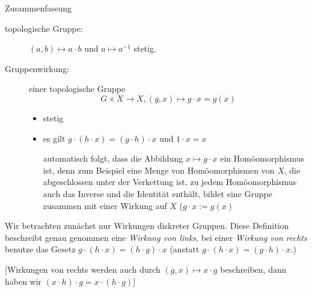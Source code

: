 \documentclass[a4paper,10pt]{scrartcl}
\begin{document}
\begin{seg}{Zusammenfassung}
 \begin{description}
  \item[topologische Gruppe:] $(a,b)\mapsto a\cdot b$ und $a\mapsto a^{-1}$ stetig.
  \item[Gruppenwirkung:] einer topologische Gruppe
\[
 G\times X\to X, (g,x) \mapsto g\cdot x=g(x) 
\]
\begin{itemize}
 \item stetig
 \item es gilt $g\cdot (h\cdot x)=(g\cdot h)\cdot x$ und $1\cdot x = x$

automatisch folgt, dass die Abbildung $x\mapsto g\cdot x$ ein Homöomorphismus ist, denn zum Beispiel eine Menge von Homöomorphismen von $X$, die abgeschlossen unter der Verkettung ist, zu jedem Homöomorphismus auch das Inverse und die Identität enthält, bildet eine Gruppe zusammen mit einer Wirkung auf $X$ ($g\cdot x:=g(x)$
\end{itemize}
 \end{description}
\end{seg}
Wir betrachten zunächst nur Wirkungen diskreter Gruppen. Diese Definition beschreibt genau genommen eine \emph{Wirkung von links}, bei einer \emph{Wirkung von rechts} benutze das Gesetz $g\cdot (h\cdot x)=(h\cdot g)\cdot x$ (anstatt $g\cdot(h\cdot x)=(g\cdot h)\cdot x$.)

[Wirkungen von rechts werden auch durch $(g,x)\mapsto x\cdot g$ beschreiben, dann haben wir $(x\cdot h)\cdot g=x\cdot (h\cdot g)$]
\end{document}
